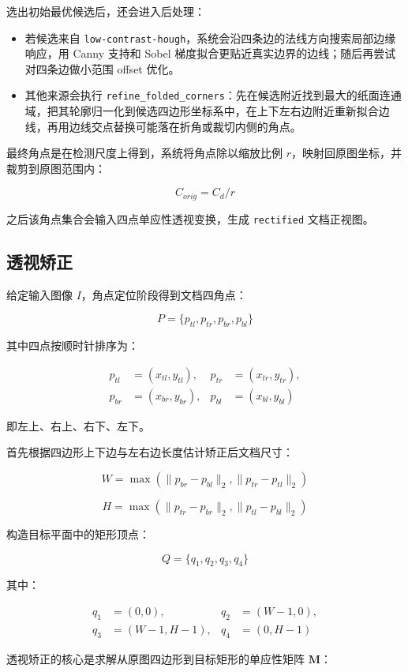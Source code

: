 \documentclass[letterpaper]{article}
\begin{document}
选出初始最优候选后，还会进入后处理：

\begin{itemize}
\item 若候选来自 \texttt{low-contrast-hough}，系统会沿四条边的法线方向搜索局部边缘响应，用 Canny 支持和 Sobel 梯度拟合更贴近真实边界的边线；随后再尝试对四条边做小范围 offset 优化。
\item 其他来源会执行 \texttt{refine\_folded\_corners}：先在候选附近找到最大的纸面连通域，把其轮廓归一化到候选四边形坐标系中，在上下左右边附近重新拟合边线，再用边线交点替换可能落在折角或裁切内侧的角点。
\end{itemize}

最终角点是在检测尺度上得到，系统将角点除以缩放比例 \(r\)，映射回原图坐标，并裁剪到原图范围内：

\[
C_{orig}=C_d/r
\]

之后该角点集合会输入四点单应性透视变换，生成 \texttt{rectified} 文档正视图。

\subsection{透视矫正}

给定输入图像 \(I\)，角点定位阶段得到文档四角点：

\[
P=\{p_{tl},p_{tr},p_{br},p_{bl}\}
\]

其中四点按顺时针排序为：

\[
\begin{aligned}
p_{tl}&=(x_{tl},y_{tl}),&
p_{tr}&=(x_{tr},y_{tr}),\\
p_{br}&=(x_{br},y_{br}),&
p_{bl}&=(x_{bl},y_{bl})
\end{aligned}
\]

即左上、右上、右下、左下。

首先根据四边形上下边与左右边长度估计矫正后文档尺寸：

\[
W=\max(\|p_{br}-p_{bl}\|_2,\|p_{tr}-p_{tl}\|_2)
\]

\[
H=\max(\|p_{tr}-p_{br}\|_2,\|p_{tl}-p_{bl}\|_2)
\]

构造目标平面中的矩形顶点：

\[
Q=\{q_1,q_2,q_3,q_4\}
\]

其中：

\[
\begin{aligned}
q_1&=(0,0),&
q_2&=(W-1,0),\\
q_3&=(W-1,H-1),&
q_4&=(0,H-1)
\end{aligned}
\]

透视矫正的核心是求解从原图四边形到目标矩形的单应性矩阵 \(\mathbf{M}\)：
\end{document}
